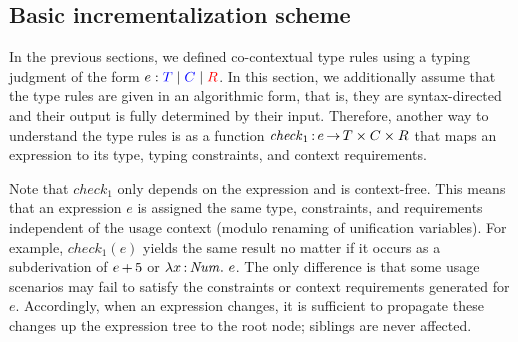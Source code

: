 \documentclass{llncs}
\begin{document}



\subsection{Basic incrementalization scheme}
\label{sec:incremental:basic}
 
In the previous sections, we defined co-contextual type rules using a typing
judgment of the form $\cojudge {e} {T} {C} {\reqs}$. In this section, we
additionally assume that the type rules are given in an algorithmic form, that
is, they are syntax-directed and their output is fully determined by their
input. Therefore, another way to understand the type rules is as a function
$\mathit{check}_1 \mathop{:} e \mathop{\rightarrow} T \times C \times R$ that maps an expression to its
type, typing constraints, and context requirements.

Note that $\mathit{check}_1$ only depends on the expression and is
context-free. This means that an expression $e$ is assigned the same type,
constraints, and requirements independent of the usage context (modulo renaming
of unification variables). For example, $\mathit{check}_1(e)$ yields the same
result no matter if it occurs as a subderivation of $e \mathop{+} 5$ or
$\lambda x \mathop{:} \mathit{Num}.\ e$. The only difference is that some usage scenarios may fail
to satisfy the constraints or context requirements generated for
$e$. Accordingly, when an expression changes, it is sufficient to propagate
these changes up the expression tree to the root node; siblings are never
affected.
\end{document}
